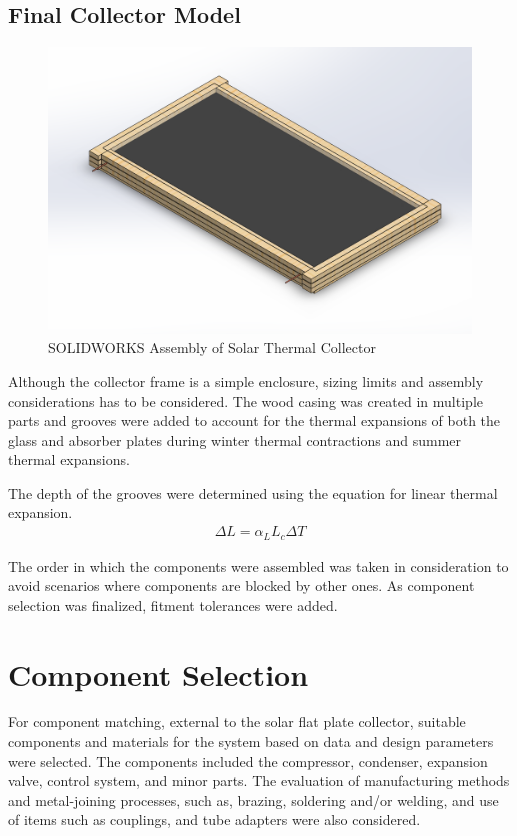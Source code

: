 \subsection{Final Collector Model}

\begin{figure}[H]
    \centering
    \includegraphics[width=\textwidth]{images/collector_assembly.png}
    \caption{SOLIDWORKS Assembly of Solar Thermal Collector}
\end{figure}


\medskip
Although the collector frame is a simple enclosure, sizing limits and assembly considerations has to be considered. The wood casing was created in multiple parts and grooves were added to account for the thermal expansions of both the glass and absorber plates during winter thermal contractions and summer thermal expansions. 

\medskip
The depth of the grooves were determined using the equation for linear thermal expansion.
\begin{align}
    \Delta L = \alpha_L L_c \Delta T
\end{align}

\medskip
The order in which the components were assembled was taken in consideration to avoid scenarios where components are blocked by other ones. As component selection was finalized, fitment tolerances were added.
\medskip

\section{Component Selection}

For component matching, external to the solar flat plate collector, suitable components and materials for the system based on data and design parameters were selected. The components included the compressor, condenser, expansion valve, control system, and minor parts. The evaluation of manufacturing methods and metal-joining processes, such as, brazing, soldering and/or welding, and use of items such as couplings, and tube adapters were also considered.

